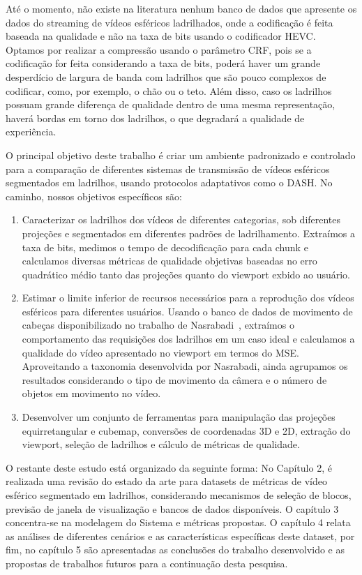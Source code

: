 Até o momento, não existe na literatura nenhum banco de dados que apresente os dados do streaming de vídeos esféricos ladrilhados, onde a codificação é feita baseada na qualidade e não na taxa de bits usando o codificador HEVC. Optamos por realizar a compressão usando o parâmetro CRF, pois se a codificação for feita considerando a taxa de bits, poderá haver um grande desperdício de largura de banda com ladrilhos que são pouco complexos de codificar, como, por exemplo, o chão ou o teto. Além disso, caso os ladrilhos possuam grande diferença de qualidade dentro de uma mesma representação, haverá bordas em torno dos ladrilhos, o que degradará a qualidade de experiência.

O principal objetivo deste trabalho é criar um ambiente padronizado e controlado para a comparação de diferentes sistemas de transmissão de vídeos esféricos segmentados em ladrilhos, usando protocolos adaptativos como o DASH. No caminho, nossos objetivos específicos são:

\begin{enumerate}
	\item Caracterizar os ladrilhos dos vídeos de diferentes categorias, sob diferentes projeções e segmentados em diferentes padrões de ladrilhamento. Extraímos a taxa de bits, medimos o tempo de decodificação para cada chunk e calculamos diversas métricas de qualidade objetivas baseadas no erro quadrático médio tanto das projeções quanto do viewport exbido ao usuário.
	
	\item Estimar o limite inferior de recursos necessários para a reprodução dos vídeos esféricos para diferentes usuários. Usando o banco de dados de movimento de cabeças disponibilizado no trabalho de Nasrabadi~\cite{Nasrabadi2019}, extraímos o comportamento das requisições dos ladrilhos em um caso ideal e calculamos a qualidade do vídeo apresentado no viewport em termos do MSE. Aproveitando a taxonomia desenvolvida por Nasrabadi, ainda agrupamos os resultados considerando o tipo de movimento da câmera e o número de objetos em movimento no vídeo.
	
	\item Desenvolver um conjunto de ferramentas para manipulação das projeções equirretangular e cubemap, conversões de coordenadas 3D e 2D, extração do viewport, seleção de ladrilhos e cálculo de métricas de qualidade.
\end{enumerate}

O restante deste estudo está organizado da seguinte forma: No Capítulo 2, é realizada uma revisão do estado da arte para datasets de métricas de vídeo esférico segmentado em ladrilhos, considerando mecanismos de seleção de blocos, previsão de janela de visualização e bancos de dados disponíveis. O capítulo 3 concentra-se na modelagem do Sistema e métricas propostas. O capítulo 4 relata as análises de diferentes cenários e as características específicas deste dataset, por fim, no capítulo 5 são apresentadas as conclusões do trabalho desenvolvido e as propostas de trabalhos futuros para a continuação desta pesquisa.



